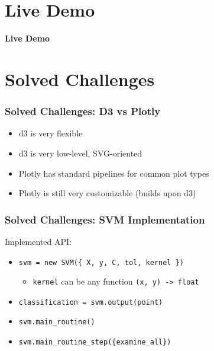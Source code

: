 \documentclass[english,hangout]{beamer}
\begin{document}
\section{Live Demo}
\begin{frame}[plain]
	\begin{center}
		\textbf{Live Demo}
	\end{center}
\end{frame}

\section{Solved Challenges}

\begin{frame}
	\frametitle{Solved Challenges: D3 vs Plotly}

  \begin{itemize}
  \item d3 is very flexible
  \item d3 is very low-level, SVG-oriented
  \item Plotly has standard pipelines for common plot types
  \item Plotly is still very customizable (builds upon d3)
  \end{itemize}

\end{frame}

\begin{frame}[fragile]
	\frametitle{Solved Challenges: SVM Implementation}
  Implemented API:
  \begin{itemize}
  \item \verb|svm = new SVM({ X, y, C, tol, kernel })|
    \begin{itemize}
    \item \verb|kernel| can be any function \verb|(x, y) -> float|
    \end{itemize}
  \item \verb|classification = svm.output(point)|
  \item \verb|svm.main_routine()|
  \item \verb|svm.main_routine_step({examine_all})|
  \end{itemize}
\end{frame}
\end{document}
